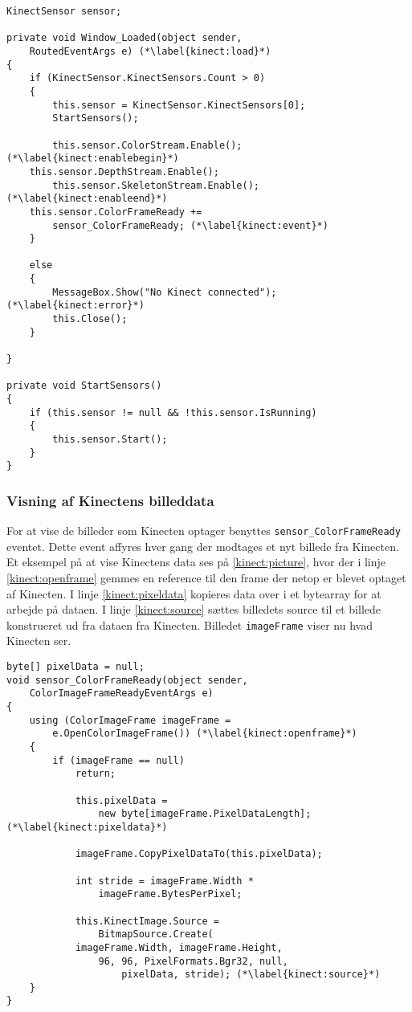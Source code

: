 \begin{lstlisting}[style=csharp, label=kinect:initialisering, caption={Initialisering af en Kinect sensor}]
KinectSensor sensor;

private void Window_Loaded(object sender,
	RoutedEventArgs e) (*\label{kinect:load}*)
{
    if (KinectSensor.KinectSensors.Count > 0)
    {
        this.sensor = KinectSensor.KinectSensors[0];
        StartSensors();
        
        this.sensor.ColorStream.Enable();(*\label{kinect:enablebegin}*)    
	this.sensor.DepthStream.Enable();
        this.sensor.SkeletonStream.Enable();(*\label{kinect:enableend}*)
	this.sensor.ColorFrameReady += 
		sensor_ColorFrameReady; (*\label{kinect:event}*)
    }

    else
    {
        MessageBox.Show("No Kinect connected"); (*\label{kinect:error}*)
        this.Close();
    }

}

private void StartSensors()
{
    if (this.sensor != null && !this.sensor.IsRunning)
    {
        this.sensor.Start();
    }
}
\end{lstlisting}

\subsubsection{Visning af Kinectens billeddata}
For at vise de billeder som Kinecten optager benyttes \lstinline[style=csharp]!sensor_ColorFrameReady! eventet. 
Dette event affyres hver gang der modtages et nyt billede fra Kinecten. 
Et eksempel på at vise Kinectens data ses på \cref{kinect:picture}, hvor der i linje \ref{kinect:openframe} gemmes en reference til den frame der netop er blevet optaget af Kinecten.
I linje \ref{kinect:pixeldata} kopieres data over i et bytearray for at arbejde på dataen. 
I linje \ref{kinect:source} sættes billedets source til et billede konstrueret ud fra dataen fra Kinecten.
Billedet \lstinline[style=csharp]|imageFrame| viser nu hvad Kinecten ser.

\begin{lstlisting}[style=csharp,caption={Visning af billeddata fra Kinectens RGB-kamera}, label=kinect:picture]
byte[] pixelData = null;
void sensor_ColorFrameReady(object sender,
	ColorImageFrameReadyEventArgs e)
{
    using (ColorImageFrame imageFrame = 
    	e.OpenColorImageFrame()) (*\label{kinect:openframe}*)
    {
        if (imageFrame == null)
            return;

            this.pixelData = 
            	new byte[imageFrame.PixelDataLength];(*\label{kinect:pixeldata}*)

            imageFrame.CopyPixelDataTo(this.pixelData);

            int stride = imageFrame.Width *
            	imageFrame.BytesPerPixel;

            this.KinectImage.Source = 
            	BitmapSource.Create(
            imageFrame.Width, imageFrame.Height, 
            	96, 96, PixelFormats.Bgr32, null, 
            		pixelData, stride); (*\label{kinect:source}*)
    }
}    
\end{lstlisting}

